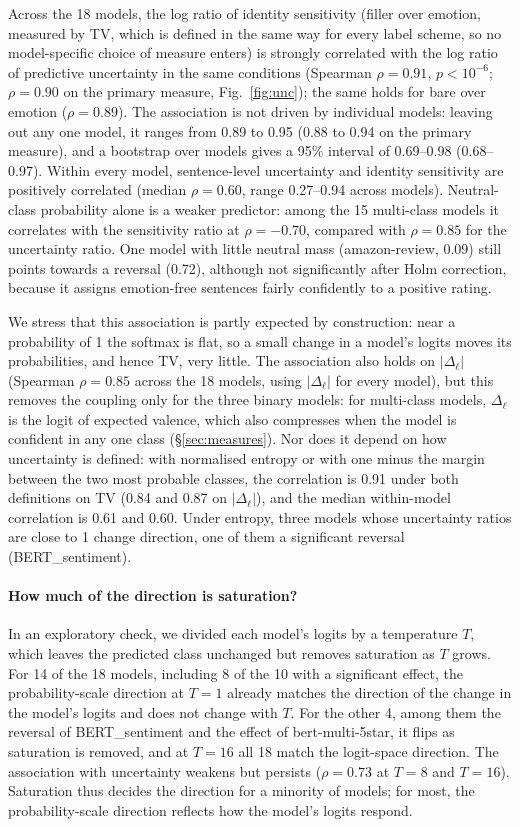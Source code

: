\documentclass[runningheads]{llncs}
\begin{document}
Across the 18 models, the log ratio of identity sensitivity (filler over
emotion, measured by TV, which is defined in the same way for every label
scheme, so no model-specific choice of measure enters) is strongly correlated with the log ratio of predictive uncertainty
in the same conditions (Spearman $\rho = 0.91$, $p<10^{-6}$; $\rho=0.90$ on the
primary measure, Fig.~\ref{fig:unc}); the same holds for bare over emotion
($\rho=0.89$). The association is not driven by individual models: leaving out
any one model, it ranges from 0.89 to 0.95 (0.88 to 0.94 on the primary
measure), and a bootstrap over models gives a 95\% interval of 0.69--0.98
(0.68--0.97). Within every model, sentence-level uncertainty
and identity sensitivity are positively correlated (median $\rho=0.60$, range
0.27--0.94 across models). Neutral-class probability alone is a weaker
predictor: among the 15 multi-class models it correlates with the sensitivity
ratio at $\rho=-0.70$, compared with $\rho=0.85$ for the uncertainty ratio. One
model with little neutral mass (amazon-review, 0.09) still points towards a
reversal (0.72), although not significantly after Holm correction, because it
assigns emotion-free sentences fairly confidently to a positive rating.

We stress that this association is partly expected by construction: near a
probability of 1 the softmax is flat, so a small change in a model's logits
moves its probabilities, and hence TV, very little. The association also holds
on $|\Delta_\ell|$ (Spearman $\rho=0.85$ across the 18 models, using
$|\Delta_\ell|$ for every model), but this removes the coupling only for the
three binary models: for multi-class models, $\Delta_\ell$ is the logit of
expected valence, which also compresses when the model is confident in any one
class (\S\ref{sec:measures}). Nor does it
depend on how uncertainty is defined: with normalised entropy or with one minus
the margin between the two most probable classes, the correlation is 0.91 under
both definitions on TV (0.84 and 0.87 on $|\Delta_\ell|$), and the median
within-model correlation is 0.61 and 0.60. Under entropy, three models whose
uncertainty ratios are close to 1 change direction, one of them a significant
reversal (BERT\_sentiment).

\paragraph{How much of the direction is saturation?} In an exploratory check,
we divided each model's logits by a temperature $T$, which leaves the predicted
class unchanged but removes saturation as $T$ grows. For 14 of the 18 models,
including 8 of the 10 with a significant effect, the probability-scale direction
at $T=1$ already matches the direction of the change in the model's logits and
does not change with $T$. For the other 4, among them the reversal of
BERT\_sentiment and the effect of bert-multi-5star, it flips as saturation is
removed, and at $T=16$ all 18 match the logit-space direction. The
association with uncertainty weakens but persists ($\rho=0.73$ at $T=8$ and
$T=16$). Saturation thus decides the direction for a minority of models; for
most, the probability-scale direction reflects how the model's logits respond.
\end{document}
